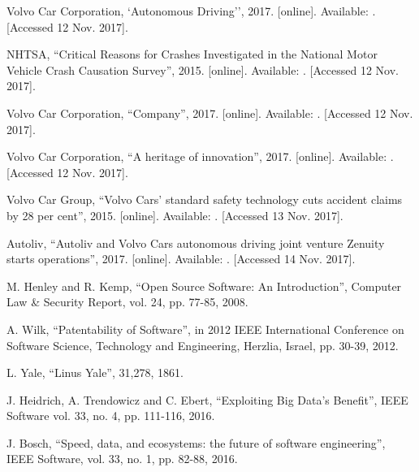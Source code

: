 \documentclass[conference]{IEEEtran}
\begin{document}
\begin{thebibliography}{00}
	Volvo Car Corporation,
	`Autonomous Driving'',
	2017.
	[online]. Available: .
	[Accessed 12 Nov. 2017].
	
	NHTSA,
	``Critical Reasons for Crashes Investigated in the National Motor Vehicle Crash Causation Survey'',
	2015.
	[online]. Available: .
	[Accessed 12 Nov. 2017].
	
	Volvo Car Corporation,
	``Company'',
	2017.
	[online]. Available: 
	.
	[Accessed 12 Nov. 2017].
	
	Volvo Car Corporation,
	``A heritage of innovation'',
	2017.
	[online]. Available: .
	[Accessed 12 Nov. 2017].
	
	Volvo Car Group,
	``Volvo Cars' standard safety technology cuts accident claims by 28 per cent'',
	2015.
	[online]. Available: .
	[Accessed 13 Nov. 2017].
	
	Autoliv,
	``Autoliv and Volvo Cars autonomous driving joint venture Zenuity starts operations'',
	2017.
	[online]. Available: .
	[Accessed 14 Nov. 2017].
	
	M. Henley and R. Kemp,
	``Open Source Software: An Introduction'', 
	Computer Law \& Security Report,
	vol. 24, pp. 77-85, 
	2008.
	
	A. Wilk,
	``Patentability of Software'',
	in 2012 IEEE International Conference on Software Science, Technology and Engineering,
	Herzlia, Israel,
	pp. 30-39,
	2012.
	
	L. Yale,
	``Linus Yale'',
	31,278,
	1861.
	
	J. Heidrich, A. Trendowicz and C. Ebert,
	``Exploiting Big Data's Benefit'',
	IEEE Software 
	vol. 33, no. 4, pp. 111-116,
	2016.
	
	J. Bosch,
	``Speed, data, and ecosystems: the future of software engineering'',
	IEEE Software,
	vol. 33, no. 1, pp. 82-88, 
	2016.
	

\end{thebibliography}
\end{document}
